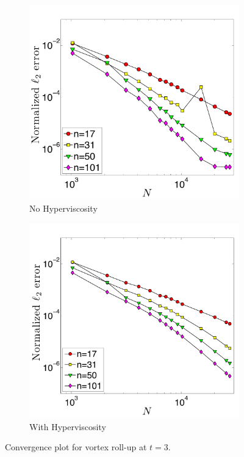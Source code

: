 \documentclass{report}
\begin{document}
\begin{figure}[ht]
\centering
\begin{subfigure}[b]{0.48\textwidth}
\centering
\includegraphics[width=\textwidth] {../figures/paper1/figures/vortex_rollup/convergence_plot_nohv_color.pdf}
\caption{No Hyperviscosity}
\label{fig:conv_plot_vortex_nohv}
\end{subfigure}
\begin{subfigure}[b]{0.48\textwidth}
\centering
\includegraphics[width=\textwidth] {../figures/paper1/figures/vortex_rollup/convergence_plot_hv_color.pdf}
\caption{With Hyperviscosity}
\label{fig:conv_plot_vortex_hv}
\end{subfigure}
\caption{Convergence plot for vortex roll-up at $t=3$.}
\label{fig:conv_plot_vortex}
\end{figure}
\end{document}
